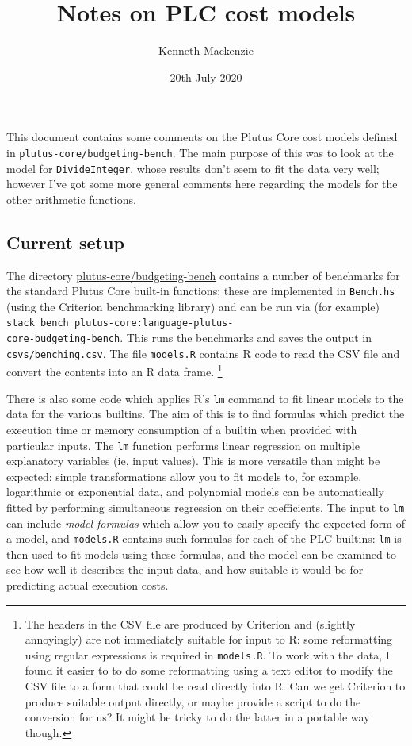 \documentclass[a4paper]{article}
\title{Notes on PLC cost models}
\author{Kenneth Mackenzie}
\date{20th July 2020}
\begin{document}
\maketitle
\noindent This document contains some comments on the Plutus Core cost models
defined in \verb|plutus-core/budgeting-bench|.  The main purpose
of this was to look at the model for \verb|DivideInteger|, whose results
don't seem to fit the data very well; however I've got some more general
comments here regarding the models for the other arithmetic functions.

\subsection*{Current setup}  The directory \url{plutus-core/budgeting-bench}
contains a number of benchmarks for the standard Plutus Core built-in
functions; these are implemented in \verb|Bench.hs| (using the
Criterion benchmarking library) and can be run via (for example)
\verb|stack bench plutus-core:|\verb|language-|\verb|plutus-|\\ \verb|core-budgeting-bench|.  This runs the benchmarks
and saves the output in \verb|csvs/benching.csv|.  The file
\verb|models.R| contains R code to read the CSV file and convert the
contents into an R data frame.%
\footnote{The headers in the CSV file are produced by Criterion and
  (slightly annoyingly) are not immediately suitable for input to R:
  some reformatting using regular expressions is required in
  \texttt{models.R}.  To work with the data, I found it easier to
  to do some reformatting using a text editor to modify the CSV
  file to a form that could be read directly into R.  Can we get Criterion
  to produce suitable output directly, or maybe provide a script to
  do the conversion for us?  It might be tricky to do the latter in a portable way though.}

There is also some code which applies R's \verb|lm| command to fit
linear models to the data for the various builtins.  The aim of this
is to find formulas which predict the execution time or memory
consumption of a builtin when provided with particular inputs.  The
\texttt{lm} function performs linear regression on multiple
explanatory variables (ie, input values).  This is more versatile than
might be expected: simple transformations allow you to fit models to,
for example, logarithmic or exponential data, and polynomial models
can be automatically fitted by performing simultaneous regression on
their coefficients.  The input to \texttt{lm} can include
\textit{model formulas} which allow you to easily specify the expected
form of a model, and \verb|models.R| contains such formulas for each
of the PLC builtins: \verb|lm| is then used to fit models using these
formulas, and the model can be examined to see how well it describes
the input data, and how suitable it would be for predicting actual
execution costs.
\end{document}
